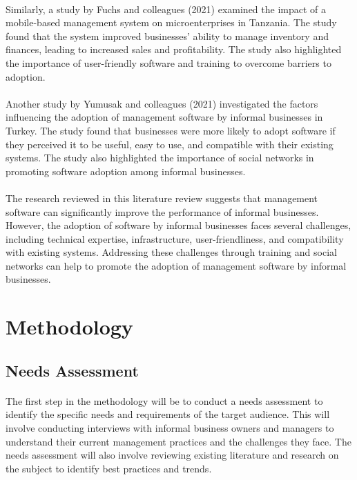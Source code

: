 \documentclass{article}
\begin{document}
\paragraph*{}
Similarly, a study by Fuchs and colleagues (2021) examined the impact of a mobile-based management system on microenterprises in Tanzania. The study found that the system improved businesses' ability to manage inventory and finances, leading to increased sales and profitability. The study also highlighted the importance of user-friendly software and training to overcome barriers to adoption.

\paragraph*{}
Another study by Yumusak and colleagues (2021) investigated the factors influencing the adoption of management software by informal businesses in Turkey. The study found that businesses were more likely to adopt software if they perceived it to be useful, easy to use, and compatible with their existing systems. The study also highlighted the importance of social networks in promoting software adoption among informal businesses.

\paragraph*{}
The research reviewed in this literature review suggests that management software can significantly improve the performance of informal businesses. However, the adoption of software by informal businesses faces several challenges, including technical expertise, infrastructure, user-friendliness, and compatibility with existing systems. Addressing these challenges through training and social networks can help to promote the adoption of management software by informal businesses.


\newpage

\section{Methodology}
\subsection{Needs Assessment}
\paragraph*{}
The first step in the methodology will be to conduct a needs assessment to identify the specific needs and requirements of the target audience. This will involve conducting interviews with informal business owners and managers to understand their current management practices and the challenges they face. The needs assessment will also involve reviewing existing literature and research on the subject to identify best practices and trends.
\end{document}
